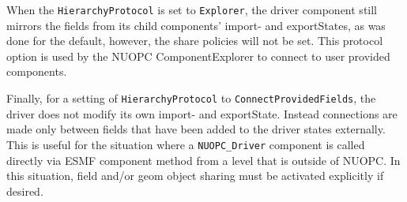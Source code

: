 When the {\tt HierarchyProtocol} is set to {\tt Explorer}, the driver component still mirrors the fields from its child components' import- and exportStates, as was done for the default, however, the share policies will not be set. This protocol option is used by the NUOPC ComponentExplorer to connect to user provided components.

Finally, for a setting of {\tt HierarchyProtocol} to {\tt ConnectProvidedFields}, the driver does not modify its own import- and exportState. Instead connections are made only between fields that have been added to the driver states externally. This is useful for the situation where a {\tt NUOPC\_Driver} component is called directly via ESMF component method from a level that is outside of NUOPC. In this situation, field and/or geom object sharing must be activated explicitly if desired.

